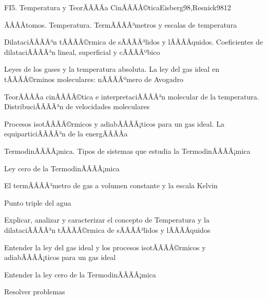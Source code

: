 \begin{sumilla}
\begin{unit}{FI5. Temperatura y TeorÃÂÃÂ­a CinÃÂÃÂ©tica}{Eisberg98,Resnick98}{12}
\begin{topicos}
         \item  ÃÂÃÂtomos. Temperatura. TermÃÂÃÂ³metros y escalas de temperatura
	 \item  DilataciÃÂÃÂ³n tÃÂÃÂ©rmica de sÃÂÃÂ³lidos y lÃÂÃÂ­quidos. Coeficientes de dilataciÃÂÃÂ³n lineal, superficial y cÃÂÃÂºbico
         \item  Leyes de los gases y la temperatura absoluta. La ley del gas ideal en tÃÂÃÂ©rminos moleculares: nÃÂÃÂºmero de Avogadro
	 \item  TeorÃÂÃÂ­a cinÃÂÃÂ©tica e interpretaciÃÂÃÂ³n molecular de la temperatura. DistribuciÃÂÃÂ³n de velocidades moleculares
         \item  Procesos isotÃÂÃÂ©rmicos y adiabÃÂÃÂ¡ticos para un gas ideal. La equiparticiÃÂÃÂ³n de la energÃÂÃÂ­a
	 \item  TermodinÃÂÃÂ¡mica. Tipos de sistemas que estudia la TermodinÃÂÃÂ¡mica
         \item  Ley cero de la TermodinÃÂÃÂ¡mica
	 \item  El termÃÂÃÂ³metro de gas a volumen constante y la escala Kelvin
         \item  Punto triple del agua
   \end{topicos}

   \begin{objetivos}
         \item  Explicar, analizar y caracterizar el concepto de Temperatura y la dilataciÃÂÃÂ³n tÃÂÃÂ©rmica de sÃÂÃÂ³lidos y lÃÂÃÂ­quidos
         \item  Entender la ley del gas ideal y los procesos isotÃÂÃÂ©rmicos y adiabÃÂÃÂ¡ticos para un gas ideal
         \item  Entender la ley cero de la TermodinÃÂÃÂ¡mica
         \item  Resolver problemas
   \end{objetivos}
\end{unit}


\end{sumilla}
